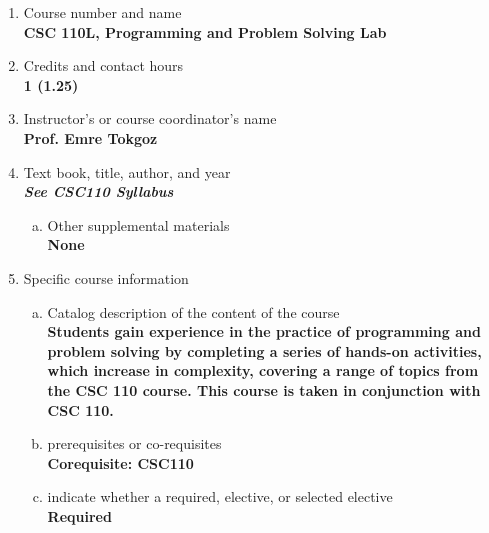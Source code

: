 \label{CSC110L}  %
\begin{enumerate}[1.]
\item Course number and name\\
  {\bfseries
CSC 110L, Programming and Problem Solving Lab
  }

\item Credits and contact hours\\
  {\bfseries
1 (1.25)
  }

\item Instructor's or course coordinator's name\\
  {\bfseries
Prof. Emre Tokgoz
  }

\item Text book, title, author, and year\\
  {\bfseries
    \emph{See CSC110 Syllabus}
  }
\begin{enumerate}[a.]
\item Other supplemental materials\\
  {\bfseries
    None
  }
\end{enumerate}

\item Specific course information
\begin{enumerate}[a.]
\item Catalog description of the content of the course\\
  {\bfseries
Students gain experience in the practice of programming and problem solving by
completing a series of hands-on activities, which increase in complexity, covering a range of topics from the
CSC 110 course. This course is taken in conjunction with CSC 110.
  }

\item prerequisites or co-requisites\\
  {\bfseries
    Corequisite: CSC110
  }

\item indicate whether a required, elective, or selected elective\\ %
  {\bfseries
    Required
  }


\end{enumerate}
\end{enumerate}
